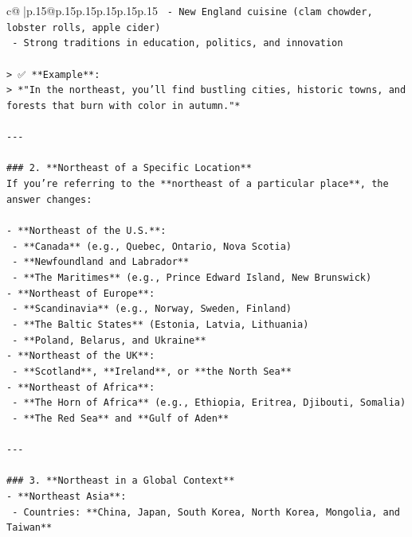 \documentclass{article}
\begin{document}
{\begin{supertabular}{c@{$\;$}|p{.15\linewidth}@{}p{.15\linewidth}p{.15\linewidth}p{.15\linewidth}p{.15\linewidth}p{.15\linewidth}}
{{{\texttt{  {-} New England cuisine (clam chowder, lobster rolls, apple cider)  } \\
\texttt{  {-} Strong traditions in education, politics, and innovation} \\
\\ 
\texttt{> ✅ **Example**:  } \\
\texttt{> *"In the northeast, you’ll find bustling cities, historic towns, and forests that burn with color in autumn."*} \\
\\ 
\texttt{{-}{-}{-}} \\
\\ 
\texttt{\#\#\# 2. **Northeast of a Specific Location**  } \\
\texttt{If you're referring to the **northeast of a particular place**, the answer changes:} \\
\\ 
\texttt{{-} **Northeast of the U.S.**:  } \\
\texttt{  {-} **Canada** (e.g., Quebec, Ontario, Nova Scotia)  } \\
\texttt{  {-} **Newfoundland and Labrador**  } \\
\texttt{  {-} **The Maritimes** (e.g., Prince Edward Island, New Brunswick)  } \\
\texttt{{-} **Northeast of Europe**:  } \\
\texttt{  {-} **Scandinavia** (e.g., Norway, Sweden, Finland)  } \\
\texttt{  {-} **The Baltic States** (Estonia, Latvia, Lithuania)  } \\
\texttt{  {-} **Poland, Belarus, and Ukraine**  } \\
\texttt{{-} **Northeast of the UK**:  } \\
\texttt{  {-} **Scotland**, **Ireland**, or **the North Sea**  } \\
\texttt{{-} **Northeast of Africa**:  } \\
\texttt{  {-} **The Horn of Africa** (e.g., Ethiopia, Eritrea, Djibouti, Somalia)  } \\
\texttt{  {-} **The Red Sea** and **Gulf of Aden**} \\
\\ 
\texttt{{-}{-}{-}} \\
\\ 
\texttt{\#\#\# 3. **Northeast in a Global Context**  } \\
\texttt{{-} **Northeast Asia**:  } \\
\texttt{  {-} Countries: **China, Japan, South Korea, North Korea, Mongolia, and Taiwan**  } \\
}}}
\end{supertabular}}
\end{document}
